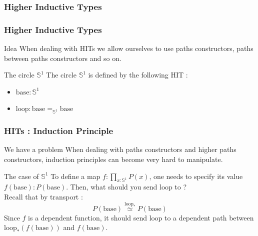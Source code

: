 \documentclass{beamer}
\begin{document}
    \subsubsection{Higher Inductive Types}
    \begin{frame}
        \frametitle{Higher Inductive Types}
        \begin{exampleblock}{Idea}
            When dealing with HITs we allow ourselves to use paths constructors, paths between paths constructors and so on.
        \end{exampleblock}
        \pause
        \begin{alertblock}{The circle $\mathbb{S}^1$}
            The circle $\mathbb{S}^1$ is defined by the following HIT : \\
            \begin{minipage}{.45\linewidth}
                \begin{itemize}
                  \item $\mathrm{base} : \mathbb{S}^1$
                  \item $\mathrm{loop} : \mathrm{base} =_{\mathbb{S}^1} \mathrm{base}$
                \end{itemize}
              \end{minipage}
              \hfill
              \begin{minipage}{.45\linewidth}
                \begin{center}
                \end{center}
            \end{minipage}
        \end{alertblock}
    \end{frame}
    \begin{frame}
        \frametitle{HITs : Induction Principle}
        \begin{alertblock}{We have a problem}
            When dealing with paths constructors and higher paths constructors, induction principles can become very hard to manipulate. 
        \end{alertblock}
        \pause
        \begin{exampleblock}{The case of $\mathbb{S}^1$}
            To define a map $f : \prod_{x : \mathbb{S}^1} P(x)$, one needs to specify its value $f(\mathrm{base}) : P(\mathrm{base})$. Then, what should you send $\mathrm{loop}$ to ? \\
            \pause
            Recall that by transport : 
            $$P(\mathrm{base}) \overset{\mathrm{loop}_*} \simeq P(\mathrm{base})$$
            Since $f$ is a dependent function, it should send $\mathrm{loop}$ to a dependent path between $\mathrm{loop}_*(f(\mathrm{base}))$ and $f(\mathrm{base})$.
        \end{exampleblock}
    \end{frame}
\end{document}
